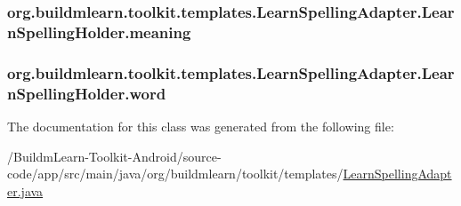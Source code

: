 \hypertarget{classorg_1_1buildmlearn_1_1toolkit_1_1templates_1_1LearnSpellingAdapter_1_1LearnSpellingHolder_afbe6d699245b23d551f1bf5105e842a6}{
\subsubsection[{meaning}]{ org.\-buildmlearn.\-toolkit.\-templates.\-Learn\-Spelling\-Adapter.\-Learn\-Spelling\-Holder.\-meaning}}\label{classorg_1_1buildmlearn_1_1toolkit_1_1templates_1_1LearnSpellingAdapter_1_1LearnSpellingHolder_afbe6d699245b23d551f1bf5105e842a6}
\hypertarget{classorg_1_1buildmlearn_1_1toolkit_1_1templates_1_1LearnSpellingAdapter_1_1LearnSpellingHolder_a6e8838ae9bf29b6005fe9fff6a174e77}{
\subsubsection[{word}]{ org.\-buildmlearn.\-toolkit.\-templates.\-Learn\-Spelling\-Adapter.\-Learn\-Spelling\-Holder.\-word}}\label{classorg_1_1buildmlearn_1_1toolkit_1_1templates_1_1LearnSpellingAdapter_1_1LearnSpellingHolder_a6e8838ae9bf29b6005fe9fff6a174e77}


The documentation for this class was generated from the following file\-:\begin{DoxyCompactItemize}
\item 
/\-Buildm\-Learn-\/\-Toolkit-\/\-Android/source-\/code/app/src/main/java/org/buildmlearn/toolkit/templates/\hyperlink{LearnSpellingAdapter_8java}{Learn\-Spelling\-Adapter.\-java}\end{DoxyCompactItemize}
